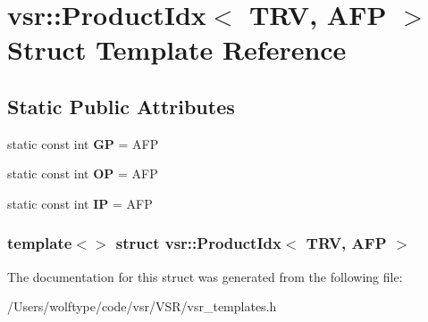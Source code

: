 \hypertarget{structvsr_1_1_product_idx_3_01_t_r_v_00_01_a_f_p_01_4}{\section{vsr\-:\-:Product\-Idx$<$ T\-R\-V, A\-F\-P $>$ Struct Template Reference}
\label{structvsr_1_1_product_idx_3_01_t_r_v_00_01_a_f_p_01_4}
}
\subsection*{Static Public Attributes}
\begin{DoxyCompactItemize}
\item 
\hypertarget{structvsr_1_1_product_idx_3_01_t_r_v_00_01_a_f_p_01_4_a2ca534519b0fb2e7b9141df8123b1960}{static const int {\bfseries G\-P} = A\-F\-P}\label{structvsr_1_1_product_idx_3_01_t_r_v_00_01_a_f_p_01_4_a2ca534519b0fb2e7b9141df8123b1960}

\item 
\hypertarget{structvsr_1_1_product_idx_3_01_t_r_v_00_01_a_f_p_01_4_a6543e9546d280a4bb13abc217aa20210}{static const int {\bfseries O\-P} = A\-F\-P}\label{structvsr_1_1_product_idx_3_01_t_r_v_00_01_a_f_p_01_4_a6543e9546d280a4bb13abc217aa20210}

\item 
\hypertarget{structvsr_1_1_product_idx_3_01_t_r_v_00_01_a_f_p_01_4_aa25f41e157024d25b91f27382ae070a0}{static const int {\bfseries I\-P} = A\-F\-P}\label{structvsr_1_1_product_idx_3_01_t_r_v_00_01_a_f_p_01_4_aa25f41e157024d25b91f27382ae070a0}

\end{DoxyCompactItemize}
\subsubsection*{template$<$$>$ struct vsr\-::\-Product\-Idx$<$ T\-R\-V, A\-F\-P $>$}



The documentation for this struct was generated from the following file\-:\begin{DoxyCompactItemize}
\item 
/\-Users/wolftype/code/vsr/\-V\-S\-R/vsr\-\_\-templates.\-h\end{DoxyCompactItemize}
